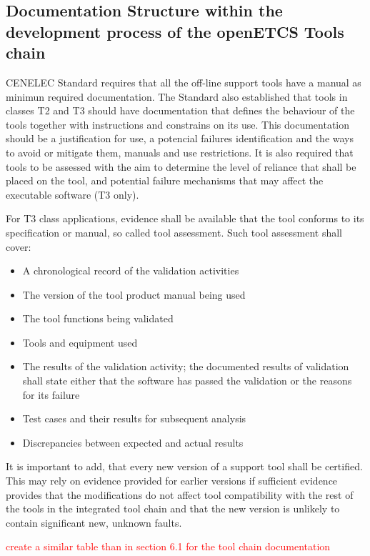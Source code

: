 \documentclass{template/openetcs_article}
\begin{document}
\subsection{Documentation Structure within the development process of the openETCS Tools chain}

CENELEC Standard requires that all the off-line support tools have a manual as  minimun required documentation. The Standard also established that tools in classes T2 and T3 should have documentation that defines the behaviour of the tools together with instructions and constrains on its use. This documentation should be a justification for use, a potencial failures identification and the ways to avoid or mitigate them, manuals and use restrictions. It is also required that tools to be assessed with the aim to determine the level of reliance that shall be placed on the tool, and potential failure mechanisms that may affect the executable software (T3 only).

For T3 class applications, evidence shall be available that the tool conforms to its specification or manual, so called tool assessment. Such tool assessment shall cover:
\begin{itemize}
\item A chronological record of the validation activities
\item The version of the tool product manual being used
\item The tool functions being validated
\item Tools and equipment used
\item The results of the validation activity; the documented results of validation shall state either that the software has passed the validation or the reasons for its failure
\item Test cases and their results for subsequent analysis
\item Discrepancies between expected and actual results
\end{itemize}

It is important to add, that every new version of a support tool shall be certified. This may rely on evidence provided for earlier versions if sufficient evidence provides that the modifications do not affect tool compatibility with the rest of the tools in the integrated tool chain and that the new version is unlikely to contain significant new, unknown faults.

\textcolor{red}{create a similar table than in section 6.1 for the tool chain documentation}
\end{document}
